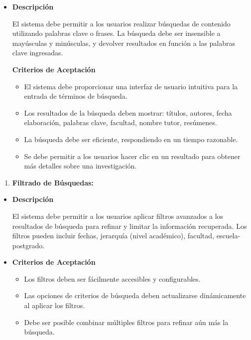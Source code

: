 \documentclass[
  12pt,
  openany]{book}
\providecommand{\tightlist}{%
  \setlength{\itemsep}{0pt}\setlength{\parskip}{0pt}}
\begin{document}
\begin{itemize}
\item
  \textbf{Descripción}

  El sistema debe permitir a los usuarios realizar búsquedas de contenido utilizando palabras clave o frases. La búsqueda debe ser insensible a mayúsculas y minúsculas, y devolver resultados en función a las palabras clave ingresadas.

  \textbf{Criterios de Aceptación}

  \begin{itemize}
  \tightlist
  \item
    El sistema debe proporcionar una interfaz de usuario intuitiva para la entrada de términos de búsqueda.
  \item
    Los resultados de la búsqueda deben mostrar: títulos, autores, fecha elaboración, palabras clave, facultad, nombre tutor, resúmenes.
  \item
    La búsqueda debe ser eficiente, respondiendo en un tiempo razonable.
  \item
    Se debe permitir a los usuarios hacer clic en un resultado para obtener más detalles sobre una investigación.
  \end{itemize}
\end{itemize}

\begin{enumerate}
\def\labelenumi{\arabic{enumi}.}
\setcounter{enumi}{2}
\tightlist
\item
  \textbf{Filtrado de Búsquedas:}
\end{enumerate}

\begin{itemize}
\item
  \textbf{Descripción}

  El sistema debe permitir a los usuarios aplicar filtros avanzados a los resultados de búsqueda para refinar y limitar la información recuperada. Los filtros pueden incluir fechas, jerarquía (nivel académico), facultad, escuela-postgrado.

  \newpage
\item
  \textbf{Criterios de Aceptación}

  \begin{itemize}
  \item
    Los filtros deben ser fácilmente accesibles y configurables.
  \item
    Las opciones de criterios de búsqueda deben actualizarse dinámicamente al aplicar los filtros.
  \item
    Debe ser posible combinar múltiples filtros para refinar aún más la búsqueda.
  \end{itemize}
\end{itemize}
\end{document}
